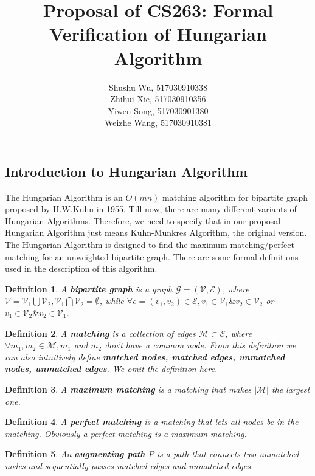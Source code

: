 \documentclass{paper}
\title{Proposal of CS263: Formal Verification of Hungarian Algorithm}
\author{Shushu Wu, 517030910338\\ Zhihui Xie, 517030910356 \\Yiwen Song, 517030901380\\Weizhe Wang, 517030910381}
\newtheorem{definition}{Definition}
\begin{document}
\maketitle
\begin{spacing}{1.2}
\section{Introduction to Hungarian Algorithm}
    The Hungarian Algorithm \cite{Hungarian} is an $O(mn)$ matching algorithm for bipartite graph proposed by H.W.Kuhn in 1955. Till now, there are many different variants of Hungarian Algorithms. Therefore, we need to specify that in our proposal Hungarian Algorithm just means Kuhn-Munkres Algorithm, the original version. \\
    The Hungarian Algorithm is designed to find the maximum matching/perfect matching for an unweighted bipartite graph. There are some formal definitions used in the description of this algorithm.
    \begin{definition}\label{bipartiteGraph}
        A \textbf{bipartite graph} is a graph $\mathcal{G}=(\mathcal{V}, \mathcal{E})$, where $\mathcal{V}=\mathcal{V}_1\bigcup\mathcal{V}_2, \mathcal{V}_1\bigcap\mathcal{V}_2=\emptyset$, while $\forall e=(v_1, v_2)\in\mathcal{E}, v_1\in\mathcal{V}_1\& v_2\in\mathcal{V}_2$ or $v_1\in\mathcal{V}_2\&v_2\in\mathcal{V}_1$.
    \end{definition}
    \begin{definition}\label{matching}
        A \textbf{matching} is a collection of edges $\mathcal{M}\subset\mathcal{E}$, where $\forall m_1, m_2\in\mathcal{M}, m_1$ and $m_2$ don't have a common node. From this definition we can also intuitively define \textbf{matched nodes, matched edges, unmatched nodes, unmatched edges}. We omit the definition here.
    \end{definition}
    \begin{definition}\label{maximumMatching}
        A \textbf{maximum matching} is a matching that makes $|\mathcal{M}|$ the largest one.
    \end{definition}
    \begin{definition}\label{perfectMatching}
        A \textbf{perfect matching} is a matching that lets all nodes be in the matching. Obviously a perfect matching is a maximum matching.
    \end{definition}
    \begin{definition}\label{augmentingPath}
        An \textbf{augmenting path} $P$ is a path that connects two unmatched nodes and sequentially passes matched edges and unmatched edges.

\end{definition}
\end{spacing}
\end{document}
